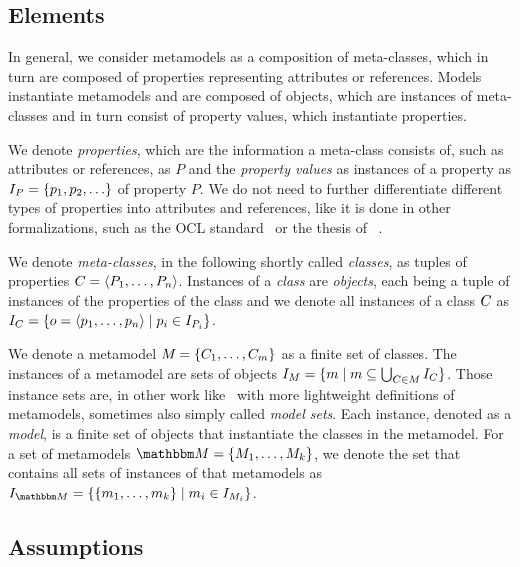 \subsection{Elements}

In general, we consider metamodels as a composition of meta-classes, which in turn are composed of properties representing attributes or references.
Models instantiate metamodels and are composed of objects, which are instances of meta-classes and in turn consist of property values, which instantiate properties.

We denote \emph{properties}, which are the information a meta-class consists of, such as attributes or references, as $P$ and the \emph{property values} as instances of a property as $\metamodelinstances{P} = \setted{p_1, p_2, \dots}$ of property $P$. 
We do not need to further differentiate different types of properties into attributes and references, like it is done in other formalizations, such as the OCL standard~\cite[A.1]{ocl} or the thesis of \citeauthor{kramer2017a}~\cite[2.3.2]{kramer2017a}.

We denote \emph{meta-classes}, in the following shortly called \emph{classes}, as tuples of properties $C_{} = \langle P_1, \dots, P_n \rangle$. 
Instances of a \emph{class} are \emph{objects}, each being a tuple of instances of the properties of the class and we denote all instances of a class $C_{}$ as $I_{C} = \{ o = \langle p_1, \dots, p_n \rangle \mid p_i \in I_{P_i} \}$.

We denote a metamodel $M_{} = \{ C_{1}, \dots, C_{m} \}$ as a finite set of classes.
The instances of a metamodel are sets of objects $I_{M} = \{ m \mid m \subseteq \bigcup_{C_{} \in M_{}} I_{C} \}$.
Those instance sets are, in other work like~\cite{stevens2020BidirectionalTransformationLarge-SoSym} with more lightweight definitions of metamodels, sometimes also simply called \emph{model sets}.
Each instance, denoted as a \emph{model}, is a finite set of objects that instantiate the classes in the metamodel.
For a set of metamodels $\metamodelset{M} = \setted{\metamodel{M}{1}, \dots, \metamodel{M}{k}}$, we denote the set that contains all sets of instances of that metamodels as $\metamodelinstances{\metamodelset{M}} = \setted{ \setted{\model{m}{1}, \dots, \model{m}{k}} \mid \model{m}{i} \in \metamodelinstances{\metamodel{M}{i}}}$.



\subsection{Assumptions}

